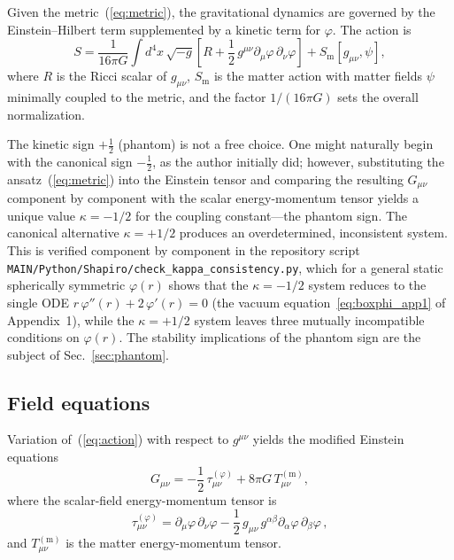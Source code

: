 \documentclass[aps,prd,onecolumn,superscriptaddress,nofootinbib,showpacs,12pt]{revtex4-2}
\begin{document}
Given the metric~(\ref{eq:metric}), the gravitational dynamics
are governed by the Einstein--Hilbert term supplemented by a
kinetic term for $\varphi$.  The action is
\begin{equation}\label{eq:action}
  S = \frac{1}{16\pi G}\int d^{4}x\,\sqrt{-g}\left[
    R + \frac{1}{2}\,g^{\mu\nu}\partial_{\mu}\varphi\,
    \partial_{\nu}\varphi\right] + S_{\mathrm{m}}[g_{\mu\nu},\psi],
\end{equation}
where $R$ is the Ricci scalar of $g_{\mu\nu}$,
$S_{\mathrm{m}}$ is the matter action with matter fields
$\psi$ minimally coupled to the metric, and the factor
$1/(16\pi G)$ sets the overall normalization.

The kinetic sign $+\frac{1}{2}$ (phantom) is not a free
choice.  One might naturally begin with the canonical sign
$-\frac{1}{2}$, as the author initially did; however,
substituting the ansatz~(\ref{eq:metric}) into the
Einstein tensor and comparing the resulting $G_{\mu\nu}$
component by component with the scalar energy-momentum
tensor yields a unique value $\kappa = -1/2$ for the
coupling constant---the phantom sign.  The canonical
alternative $\kappa = +1/2$ produces an overdetermined,
inconsistent system.  This is verified component by component
in the repository script \texttt{MAIN/Python/Shapiro/check\_kappa\_consistency.py},
which for a general static spherically symmetric $\varphi(r)$
shows that the $\kappa=-1/2$ system reduces to the single ODE
$r\,\varphi''(r)+2\,\varphi'(r)=0$ (the vacuum
equation~\ref{eq:boxphi_app1} of Appendix~1), while the
$\kappa=+1/2$ system leaves three mutually incompatible
conditions on $\varphi(r)$.  The stability implications of the
phantom sign are the subject of Sec.~\ref{sec:phantom}.

\subsection{Field equations}\label{sec:field_eqs}

Variation of~(\ref{eq:action}) with respect to $g^{\mu\nu}$
yields the modified Einstein equations
\begin{equation}\label{eq:einstein}
  G_{\mu\nu} = -\frac{1}{2}\,\tau_{\mu\nu}^{(\varphi)}
               + 8\pi G\,T_{\mu\nu}^{(\mathrm{m})},
\end{equation}
where the scalar-field energy-momentum tensor is
\begin{equation}\label{eq:Tphi}
  \tau_{\mu\nu}^{(\varphi)} = \partial_{\mu}\varphi\,
    \partial_{\nu}\varphi
    - \frac{1}{2}\,g_{\mu\nu}\,g^{\alpha\beta}
      \partial_{\alpha}\varphi\,\partial_{\beta}\varphi\,,
\end{equation}
and $T_{\mu\nu}^{(\mathrm{m})}$ is the matter
energy-momentum tensor.
\end{document}

